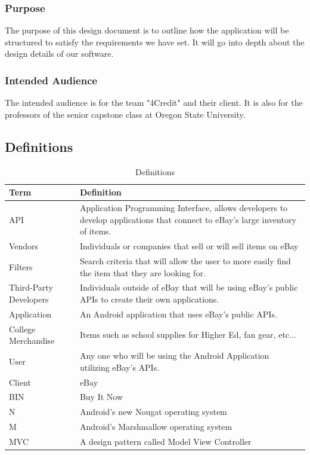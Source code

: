 \documentclass[journal,compsoc, 10pt, draftclsnofoot, onecolumn]{IEEEtran}
\begin{document}
\subsubsection{Purpose}
The purpose of this design document is to outline how the application will be 
structured to satisfy the requirements we have set. It will go into depth about 
the design details of our software.

\subsubsection{Intended Audience}
The intended audience is for the team "4Credit" and their client. It is also for
 the professors of the senior capstone class at Oregon State University.

\subsection{Definitions}

\begin{table}[!ht]
\centering
\caption{Definitions}
\label{Definition Table Design Document}
\begin{tabularx}{\textwidth}{l|X}
\hline
\textbf{Term}               & \textbf{Definition}                              \\ \hline
API                    	      & Application Programming Interface, allows developers 
to develop applications that connect to eBay's large inventory of items. \\ \hline
Vendors               	      & Individuals or companies that sell or will sell items 
on eBay   \\ \hline
Filters                	      & Search criteria that will allow the user to more easily find 
the item that they are looking for.  \\ \hline
Third-Party Developers & Individuals outside of eBay that will be using eBay's public
 APIs to create their own applications.   \\ \hline
Application & An Android application that uses eBay's public APIs. \\ \hline
College Merchandise     & Items such as school supplies for Higher Ed, fan gear,
 etc...     \\ \hline
User                   	      & Any one who will be using the Android Application utilizing
 eBay's APIs.   \\ \hline
Client                 	      & eBay             \\ \hline
BIN                    	      & Buy It Now        \\ \hline
N                   	      & Android's new Nougat operating system 
\\ \hline
M                   	      & Android's Marshmallow operating system\\ \hline
MVC                   	      & A design pattern called Model View Controller
\\ \hline
\end{tabularx}
\end{table}
\FloatBarrier
\end{document}
